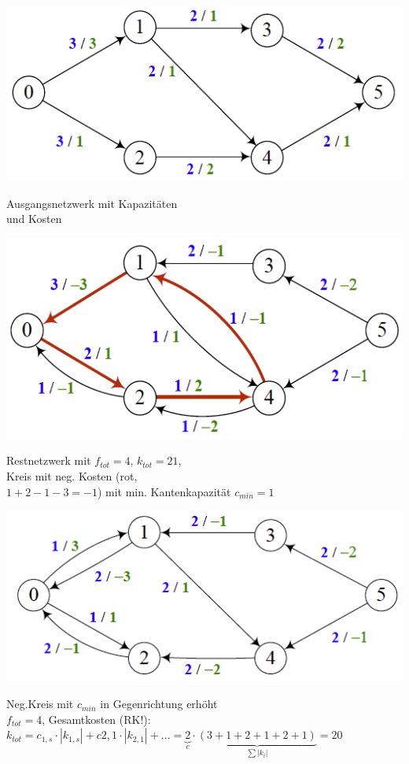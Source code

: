 \begin{minipage}{0.33\textwidth}
	\includegraphics[width=\textwidth]{Content/Graphen/MaxFlowMinCost1.png}
	
	Ausgangsnetzwerk mit Kapazitäten\\ und Kosten
\end{minipage}
\begin{minipage}{0.33\textwidth}
	\includegraphics[width=\textwidth]{Content/Graphen/MaxFlowMinCost2.png}
	
	Restnetzwerk mit $f_{tot}=4$, $k_{tot}=21$,\\ Kreis mit neg. Kosten (rot,\\ $1+2-1-3 = -1$) mit min. Kantenkapazität $c_{min} = 1$
\end{minipage}
\begin{minipage}{0.33\textwidth}
	\includegraphics[width=\textwidth]{Content/Graphen/MaxFlowMinCost3.png}
	
	Neg.Kreis mit $c_{min}$ in Gegenrichtung erhöht\\
	$f_{tot} = 4$, 
	Gesamtkosten (RK!):\\ $k_{tot} = c_{1,s}\cdot|k_{1,s}| + c{2,1}\cdot|k_{2,1}|+... =\underbrace{2}_{c}\cdot\underbrace{(3+1+2+1+2+1)}_{\sum |k_i|}=20$
\end{minipage}

